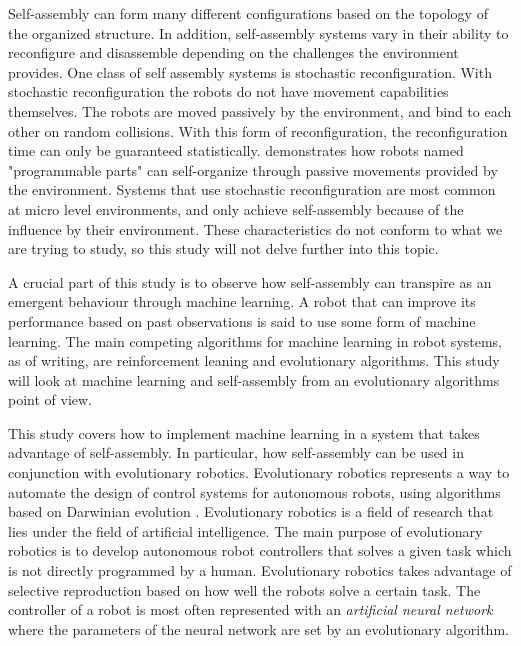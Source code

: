 Self-assembly can form many different configurations based on the topology of the organized structure.
In addition, self-assembly systems vary in their ability to reconfigure and disassemble depending on the challenges the environment provides.
One class of self assembly systems is stochastic reconfiguration. 
With stochastic reconfiguration the robots do not have movement capabilities themselves. 
The robots are moved passively by the environment, and bind to each other on random collisions\cite{gro_autonomous_2006}. 
With this form of reconfiguration, the reconfiguration time can only be guaranteed statistically\cite{yim_modular_2007}.
\cite{bishop_programmable_2005} demonstrates how robots named "programmable parts" can self-organize through passive movements provided by the environment. Systems that use stochastic reconfiguration are most common at micro level environments, and only achieve self-assembly because of the influence by their environment.
These characteristics do not conform to what we are trying to study, so this study will not delve further into this topic.

A crucial part of this study is to observe how self-assembly can transpire as an emergent behaviour through machine learning.
A robot that can improve its performance based on past observations is said to use some form of machine learning.
The main competing algorithms for machine learning in robot systems, as of writing, are reinforcement leaning and evolutionary algorithms.
This study will look at machine learning and self-assembly from an evolutionary algorithms point of view.

This study covers how to implement machine learning in a system that takes advantage of self-assembly.
In particular, how self-assembly can be used in conjunction with evolutionary robotics.
Evolutionary robotics represents a way to automate the design of control systems for autonomous robots, using algorithms based on Darwinian evolution \cite{trianni_evolving_2004}.
Evolutionary robotics is a field of research that lies under the field of artificial intelligence. 
The main purpose of evolutionary robotics is to develop autonomous robot controllers that solves a given task which is not directly programmed by a human.
Evolutionary robotics takes advantage of selective reproduction based on how well the robots solve a certain task.
The controller of a robot is most often represented with an \emph{artificial neural network} where the parameters of the neural network are set by an evolutionary algorithm.


